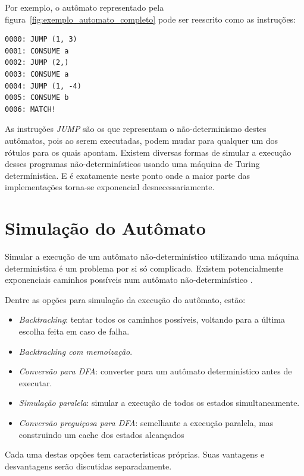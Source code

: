 \documentclass[a4paper,12pt,oneside,onecolumn]{uerj}
\begin{document}
Por exemplo, o autômato representado pela figura~\ref{fig:exemplo_automato_completo} pode ser reescrito como as instruções:

\nopagebreak 
\begin{verbatim}
0000: JUMP (1, 3)
0001: CONSUME a
0002: JUMP (2,)
0003: CONSUME a
0004: JUMP (1, -4)
0005: CONSUME b
0006: MATCH!
\end{verbatim}

As instruções \emph{JUMP} são os que representam o não-determinismo destes autômatos, pois ao serem executadas, podem mudar para qualquer um dos rótulos para os quais apontam. Existem diversas formas de simular a execução desses programas não-determinísticos usando uma máquina de Turing determínistica. E é exatamente neste ponto onde a maior parte das implementações torna-se exponencial desnecessariamente.

\section{Simulação do Autômato}\label{sec:simulacao}

Simular a execução de um autômato não-determinístico utilizando uma máquina determinística é um problema por si só complicado. Existem potencialmente exponenciais caminhos possíveis num autômato não-determinístico \cite{bib:Rabin59}.

Dentre as opções para simulação da execução do autômato, estão:

\begin{itemize}
    \item \emph{Backtracking}: tentar todos os caminhos possíveis, voltando para a última escolha feita em caso de falha.
    \item \emph{Backtracking com memoização}.
    \item \emph{Conversão para DFA}: converter para um autômato determinístico antes de executar.
    \item \emph{Simulação paralela}: simular a execução de todos os estados simultaneamente.
	\item \emph{Conversão preguiçosa para DFA}: semelhante a execução paralela, mas construindo um cache dos estados alcançados
\end{itemize}

Cada uma destas opções tem caracteristicas próprias. Suas vantagens e desvantagens serão discutidas separadamente.
\end{document}
